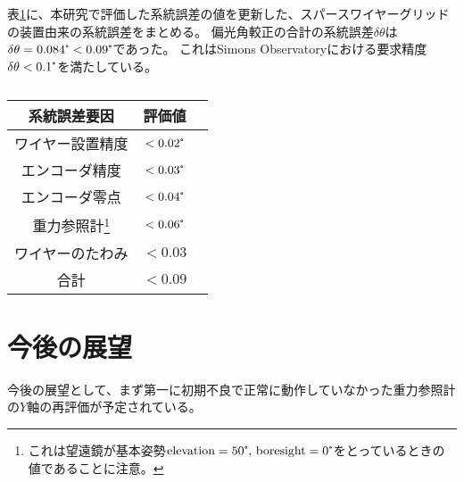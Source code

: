 \documentclass[../../main.tex]{subfiles}
\begin{document}
表\ref{tab:summary_systematic_error}に、本研究で評価した系統誤差の値を更新した、スパースワイヤーグリッドの装置由来の系統誤差をまとめる。
偏光角較正の合計の系統誤差$\delta\theta$は$\delta\theta=0.084\tcdegree<0.09\tcdegree$であった。
これはSimons Observatoryにおける要求精度$\delta\theta<0.1\tcdegree$を満たしている。
\begin{table}
    \centering
    \caption{}
    \begin{tabular}{ccc}
        \hline\hline
        系統誤差要因 & 評価値 \\
        \hline
        ワイヤー設置精度 & $<0.02\tcdegree$ \\
        エンコーダ精度 & $<0.03\tcdegree$ \\
        エンコーダ零点 & $<0.04\tcdegree$ \\
        重力参照計\footnote{これは望遠鏡が基本姿勢$\mathrm{elevation}=50\tcdegree,\,\mathrm{boresight}=0\tcdegree$をとっているときの値であることに注意。} & $<0.06\tcdegree$ \\
        ワイヤーのたわみ & $<0.03$ \\
        \hline
        合計 & $<0.09$ \\
        \hline
        \hline
    \end{tabular}
    \label{tab:summary_systematic_error}
\end{table}
\section{今後の展望}
今後の展望として、まず第一に初期不良で正常に動作していなかった重力参照計の$Y$軸の再評価が予定されている。
\end{document}
